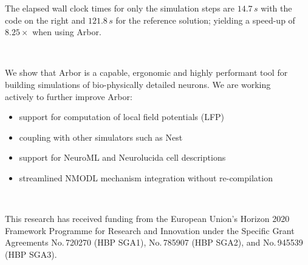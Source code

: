 \documentclass{beamer}
\begin{document}
\begin{frame}[t, fragile]
\begin{columns}[T]
\begin{column}{.49\linewidth}
      The elapsed wall clock times for only the simulation steps are $14.7\,s$
      with the code on the right and $121.8\,s$ for the reference solution;
      yielding a speed-up of $8.25\times$ when using Arbor.
    \end{column}
    \begin{column}{.49\linewidth}
      \inputminted[bgcolor=lightgray,escapeinside=!!]{python}{src/model.py}
    \end{column}
  \end{columns}
  \begin{columns}[T]
    \begin{column}{.49\linewidth}
      \textbf{}\\
      We show that Arbor is a capable, ergonomic and highly
      performant tool for building simulations of bio-physically detailed
      neurons. We are working actively to further improve Arbor:
      \begin{itemize}
        \item support for computation of local field potentials (LFP)
        \item coupling with other simulators such as Nest
        \item support for NeuroML and Neurolucida cell descriptions
        \item streamlined NMODL mechanism integration without re-compilation
      \end{itemize}
    \end{column}
    \begin{column}{.49\linewidth}
      \textbf{}\\
      \printbibliography{}
      \vfill
    \end{column}
  \end{columns}
  \textbf{}\\
  This research has received funding from the European Union's Horizon 2020
  Framework Programme for Research and Innovation under the Specific Grant
  Agreements No.\,720270 (HBP SGA1), No.\,785907 (HBP SGA2), and No.\,945539
  (HBP SGA3).\\[1.5ex]
\end{frame}
\end{document}
